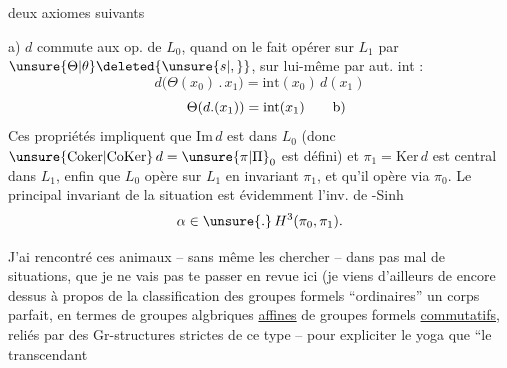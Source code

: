 deux axiomes suivants

a) $d$ commute aux op. de $L_0$, quand on le fait opérer sur $L_1$ par $\unsure{\Theta|\theta}\deleted{\unsure{s|,}}$, sur lui-même par aut. int :
\[
d\bigl(\Theta(x_0)\mathbin{.}x_1\bigr)=\mathrm{int}(x_0)\,d(x_1)
\]
\[
\Theta(d.(x_1))=\mathrm{int}(x_1)\tag*{\makebox[0pt][r]{\makebox[\displaywidth][l]{b)}}}
\]
Ces propriétés impliquent que $\mathrm{Im}\,d$ est  dans $L_0$ (donc $\unsure{\mathrm{Coker}|\mathrm{CoKer}}\,d=\unsure{\pi|\Pi}_0$ est défini) et $\pi_1=\mathrm{Ker}\,d$ est central dans $L_1$, enfin que $L_0$ opère sur $L_1$ en invariant $\pi_1$, et qu'il opère via $\pi_0$. Le principal invariant  de la situation est évidemment l'inv. de -Sinh
\[
\alpha\in\unsure{.}\,H^3(\pi_0,\pi_1).
\]

J'ai rencontré ces animaux -- sans même les chercher -- dans pas mal de situations, que je ne vais pas te passer en revue ici (je viens d'ailleurs de  encore dessus à propos de la classification des groupes formels ``ordinaires''  un corps parfait, en termes de groupes algbriques \uline{affines}\unsure{,|;} de groupes formels \uline{commutatifs}, reliés par des Gr-structures strictes de ce type%
 -- pour expliciter le yoga que ``le  transcendant 
